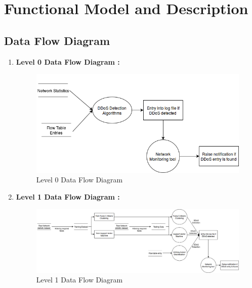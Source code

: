 \documentclass[12pt,a4paper,final]{report}
\begin{document}
\newpage
\section{Functional Model and Description}
\subsection{Data Flow Diagram}
\begin{enumerate}
\item
\textbf{Level 0 Data Flow Diagram :}
\newline
\begin{figure}[h]
\begin{center}
\includegraphics[scale=0.6]{dataflow0.png}
\caption{Level 0 Data Flow Diagram}
\end{center}
\end{figure}

\item
\textbf{Level 1 Data Flow Diagram :}
\newline
\begin{figure}[h]
\begin{center}
\includegraphics[scale=0.4]{dataflow1.png}
\caption{Level 1 Data Flow Diagram}
\end{center}
\end{figure}
\end{enumerate}

\newpage
\end{document}
